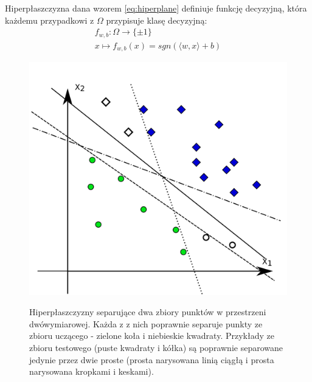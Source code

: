 Hiperpłaszczyzna dana wzorem \ref{eq:hiperplane} definiuje funkcję decyzyjną, która każdemu przypadkowi z $ \Omega $ przypisuje klasę decyzyjną:
\begin{equation}
\begin{array}{lcl}
f_{w,b}: \Omega \rightarrow \{\pm 1\} \\ x \mapsto f_{w,b}(x) = sgn (\langle w, x \rangle + b)
\end{array}
\label{eq:decfunc}
\end{equation}

\begin{figure}[h]
\centering
\includegraphics[scale=0.5]{figures/functions/2-different-hyperplanes}
\label{fig:hyperplanes}
\caption{Hiperpłaszczyzny separujące dwa zbiory punktów w przestrzeni dwówymiarowej. Każda z z nich poprawnie separuje punkty ze zbioru uczącego - zielone koła i niebieskie kwadraty. Przykłady ze zbioru testowego (puste kwadraty i kółka) są poprawnie separowane jedynie przez dwie proste (prosta narysowana linią ciągłą i prosta narysowana kropkami i keskami).}
\end{figure}

